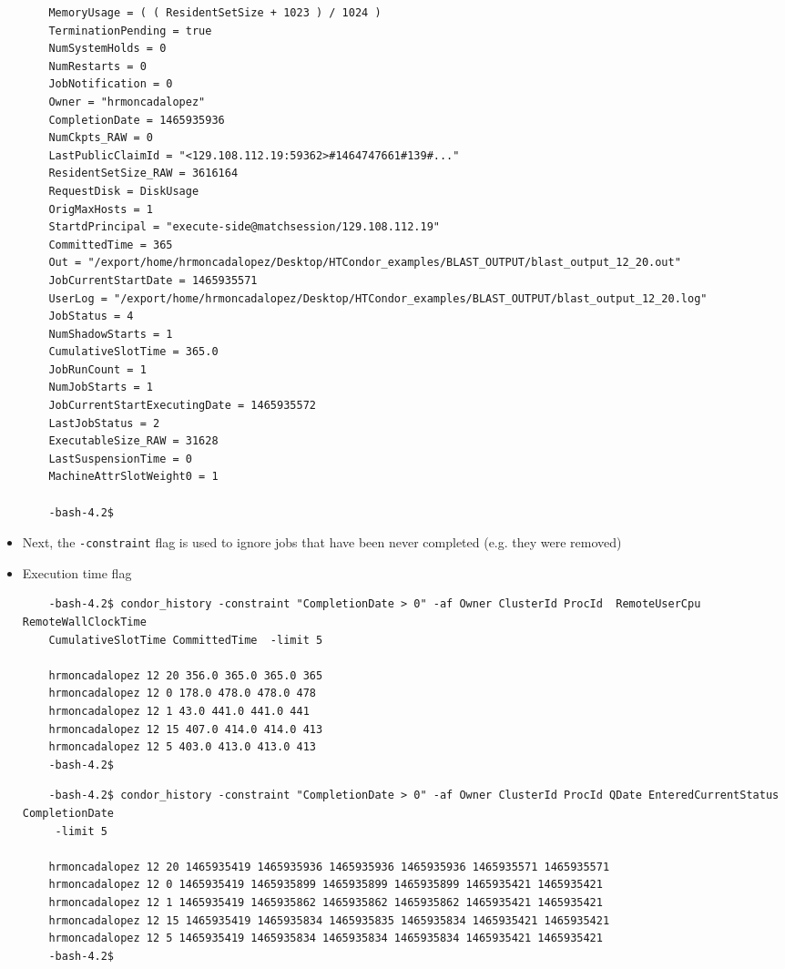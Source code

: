\documentclass{article}
\begin{document}
\begin{itemize}
\begin{verbatim}
    MemoryUsage = ( ( ResidentSetSize + 1023 ) / 1024 )
    TerminationPending = true
    NumSystemHolds = 0
    NumRestarts = 0
    JobNotification = 0
    Owner = "hrmoncadalopez"
    CompletionDate = 1465935936
    NumCkpts_RAW = 0
    LastPublicClaimId = "<129.108.112.19:59362>#1464747661#139#..."
    ResidentSetSize_RAW = 3616164
    RequestDisk = DiskUsage
    OrigMaxHosts = 1
    StartdPrincipal = "execute-side@matchsession/129.108.112.19"
    CommittedTime = 365
    Out = "/export/home/hrmoncadalopez/Desktop/HTCondor_examples/BLAST_OUTPUT/blast_output_12_20.out"
    JobCurrentStartDate = 1465935571
    UserLog = "/export/home/hrmoncadalopez/Desktop/HTCondor_examples/BLAST_OUTPUT/blast_output_12_20.log"
    JobStatus = 4
    NumShadowStarts = 1
    CumulativeSlotTime = 365.0
    JobRunCount = 1
    NumJobStarts = 1
    JobCurrentStartExecutingDate = 1465935572
    LastJobStatus = 2
    ExecutableSize_RAW = 31628
    LastSuspensionTime = 0
    MachineAttrSlotWeight0 = 1

    -bash-4.2$ 
\end{verbatim}
\normalsize
\item Next, the \verb+-constraint+ flag is used to ignore jobs that have been never completed (e.g. they were removed)
\item Execution time flag
\tiny
\begin{verbatim}
    -bash-4.2$ condor_history -constraint "CompletionDate > 0" -af Owner ClusterId ProcId  RemoteUserCpu  RemoteWallClockTime
    CumulativeSlotTime CommittedTime  -limit 5
    
    hrmoncadalopez 12 20 356.0 365.0 365.0 365
    hrmoncadalopez 12 0 178.0 478.0 478.0 478
    hrmoncadalopez 12 1 43.0 441.0 441.0 441
    hrmoncadalopez 12 15 407.0 414.0 414.0 413
    hrmoncadalopez 12 5 403.0 413.0 413.0 413
    -bash-4.2$ 
\end{verbatim}
\normalsize
\scriptsize
\begin{verbatim}
    -bash-4.2$ condor_history -constraint "CompletionDate > 0" -af Owner ClusterId ProcId QDate EnteredCurrentStatus CompletionDate 
     -limit 5
    
    hrmoncadalopez 12 20 1465935419 1465935936 1465935936 1465935936 1465935571 1465935571
    hrmoncadalopez 12 0 1465935419 1465935899 1465935899 1465935899 1465935421 1465935421
    hrmoncadalopez 12 1 1465935419 1465935862 1465935862 1465935862 1465935421 1465935421
    hrmoncadalopez 12 15 1465935419 1465935834 1465935835 1465935834 1465935421 1465935421
    hrmoncadalopez 12 5 1465935419 1465935834 1465935834 1465935834 1465935421 1465935421
    -bash-4.2$  
\end{verbatim}
\normalsize
\end{itemize}
\end{document}
